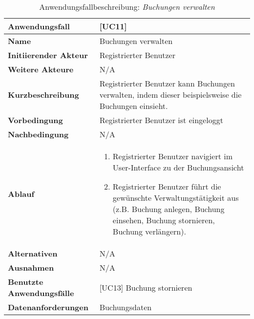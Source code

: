 \begin{table} [H]
    \centering
    \caption{Anwendungsfallbeschreibung: \emph{Buchungen verwalten}}
    \begin{tabularx}{\textwidth}{|l|X|}
        \toprule
        \textbf{Anwendungsfall}           & [UC11]                                                                                               \\
        \hline
        \textbf{Name}                     & Buchungen verwalten                                                                                  \\
        \hline
        \textbf{Initiierender Akteur}     & Registrierter Benutzer                                                                               \\
        \hline
        \textbf{Weitere Akteure}          & N/A                                                                                                  \\
        \hline
        \textbf{Kurzbeschreibung}         & Registrierter Benutzer kann Buchungen verwalten, indem dieser beispielsweise die Buchungen einsieht. \\
        \hline
        \textbf{Vorbedingung}             & Registrierter Benutzer ist eingeloggt                                                                \\
        \hline
        \textbf{Nachbedingung}            & N/A                                                                                                  \\
        \hline
        \textbf{Ablauf} & \begin{enumerate}
                              \item Registrierter Benutzer navigiert im User-Interface
                              zu der Buchungsansicht
                              \item Registrierter Benutzer führt die gewünschte Verwaltungstätigkeit aus (z.B. Buchung anlegen, Buchung einsehen, Buchung stornieren, Buchung verlängern).
        \end{enumerate} \\
        \hline
        \textbf{Alternativen}             & N/A                                                                                                  \\
        \hline
        \textbf{Ausnahmen}                & N/A                                                                                                  \\
        \hline
        \textbf{Benutzte Anwendungsfälle} & [UC13] Buchung stornieren                                                                            \\
        \hline
        \textbf{Datenanforderungen}       & Buchungsdaten                                                                                        \\
        \bottomrule
    \end{tabularx}\label{tab:UC-1}
\end{table}